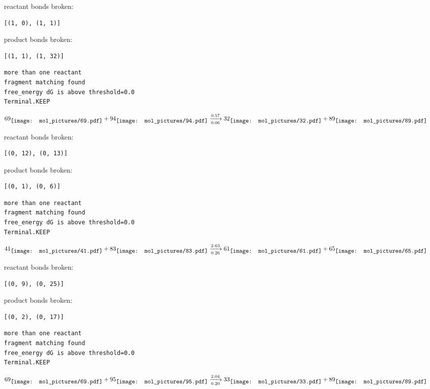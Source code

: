 \documentclass{article}
\begin{document}
reactant bonds broken:\begin{verbatim}
[(1, 0), (1, 1)]
\end{verbatim}
product bonds broken:\begin{verbatim}
[(1, 1), (1, 32)]
\end{verbatim}




\vspace{1cm}
\begin{verbatim}
more than one reactant
fragment matching found
free_energy dG is above threshold=0.0
Terminal.KEEP
\end{verbatim}
$$
69
\raisebox{-.5\height}{\texttt{[image: mol\_pictures/69.pdf]}}
+
94
\raisebox{-.5\height}{\texttt{[image: mol\_pictures/94.pdf]}}
\xrightarrow[0.06]{0.57}
32
\raisebox{-.5\height}{\texttt{[image: mol\_pictures/32.pdf]}}
+
89
\raisebox{-.5\height}{\texttt{[image: mol\_pictures/89.pdf]}}
$$


reactant bonds broken:\begin{verbatim}
[(0, 12), (0, 13)]
\end{verbatim}
product bonds broken:\begin{verbatim}
[(0, 1), (0, 6)]
\end{verbatim}




\vspace{1cm}
\begin{verbatim}
more than one reactant
fragment matching found
free_energy dG is above threshold=0.0
Terminal.KEEP
\end{verbatim}
$$
41
\raisebox{-.5\height}{\texttt{[image: mol\_pictures/41.pdf]}}
+
83
\raisebox{-.5\height}{\texttt{[image: mol\_pictures/83.pdf]}}
\xrightarrow[0.26]{2.63}
61
\raisebox{-.5\height}{\texttt{[image: mol\_pictures/61.pdf]}}
+
65
\raisebox{-.5\height}{\texttt{[image: mol\_pictures/65.pdf]}}
$$


reactant bonds broken:\begin{verbatim}
[(0, 9), (0, 25)]
\end{verbatim}
product bonds broken:\begin{verbatim}
[(0, 2), (0, 17)]
\end{verbatim}




\vspace{1cm}
\begin{verbatim}
more than one reactant
fragment matching found
free_energy dG is above threshold=0.0
Terminal.KEEP
\end{verbatim}
$$
69
\raisebox{-.5\height}{\texttt{[image: mol\_pictures/69.pdf]}}
+
95
\raisebox{-.5\height}{\texttt{[image: mol\_pictures/95.pdf]}}
\xrightarrow[0.20]{2.04}
33
\raisebox{-.5\height}{\texttt{[image: mol\_pictures/33.pdf]}}
+
89
\raisebox{-.5\height}{\texttt{[image: mol\_pictures/89.pdf]}}
$$
\end{document}
